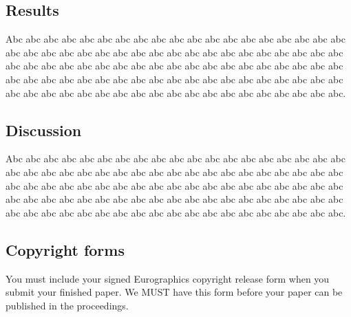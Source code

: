 \documentclass{egpubl}
\begin{document}
\subsection{Results}

   Abc abc abc abc abc abc abc abc abc abc abc abc abc abc abc abc abc abc abc abc abc abc abc abc abc abc abc abc abc abc abc abc abc abc abc abc abc abc abc abc abc abc abc abc abc abc abc abc abc abc abc abc abc abc abc abc abc abc abc abc abc abc abc abc abc abc abc abc abc abc abc abc abc abc abc abc abc abc abc abc abc abc abc abc abc abc abc abc abc abc abc abc abc abc abc.

\subsection{Discussion}

   Abc abc abc abc abc abc abc abc abc abc abc abc abc abc abc abc abc abc abc abc abc abc abc abc abc abc abc abc abc abc abc abc abc abc abc abc abc abc abc abc abc abc abc abc abc abc abc abc abc abc abc abc abc abc abc abc abc abc abc abc abc abc abc abc abc abc abc abc abc abc abc abc abc abc abc abc abc abc abc abc abc abc abc abc abc abc abc abc abc abc abc abc abc abc abc.

\subsection{Copyright forms}

You must include your signed Eurographics copyright release form
when you submit your finished paper. We MUST have this form before
your paper can be published in the proceedings.





\end{document}

